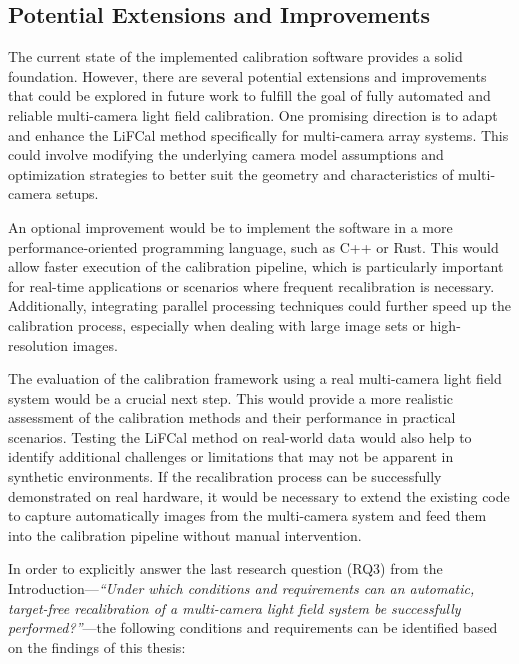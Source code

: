 \documentclass[12pt]{scrartcl}
\begin{document}
\subsection{Potential Extensions and Improvements}

The current state of the implemented calibration software provides a solid foundation. However, there are several potential extensions and improvements that could be explored in future work to fulfill the goal of fully automated and reliable multi-camera light field calibration. One promising direction is to adapt and enhance the LiFCal method specifically for multi-camera array systems. This could involve modifying the underlying camera model assumptions and optimization strategies to better suit the geometry and characteristics of multi-camera setups.
\newline

An optional improvement would be to implement the software in a more performance-oriented programming language, such as C++ or Rust. This would allow faster execution of the calibration pipeline, which is particularly important for real-time applications or scenarios where frequent recalibration is necessary. Additionally, integrating parallel processing techniques could further speed up the calibration process, especially when dealing with large image sets or high-resolution images.
\newline

The evaluation of the calibration framework using a real multi-camera light field system would be a crucial next step. This would provide a more realistic assessment of the calibration methods and their performance in practical scenarios. Testing the LiFCal method on real-world data would also help to identify additional challenges or limitations that may not be apparent in synthetic environments. If the recalibration process can be successfully demonstrated on real hardware, it would be necessary to extend the existing code to capture automatically images from the multi-camera system and feed them into the calibration pipeline without manual intervention.
\newline

In order to explicitly answer the last research question (RQ3) from the Introduction—\textit{``Under which conditions and requirements can an automatic, target-free recalibration of a multi-camera light field system be successfully performed?''}—the following conditions and requirements can be identified based on the findings of this thesis:
\end{document}
